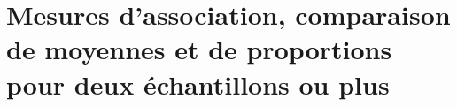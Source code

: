




\chapter[Mesures d'association, comparaison de moyennes et de
proportions]{Mesures d'association, comparaison de moyennes et de
  proportions pour deux échantillons ou plus}   

